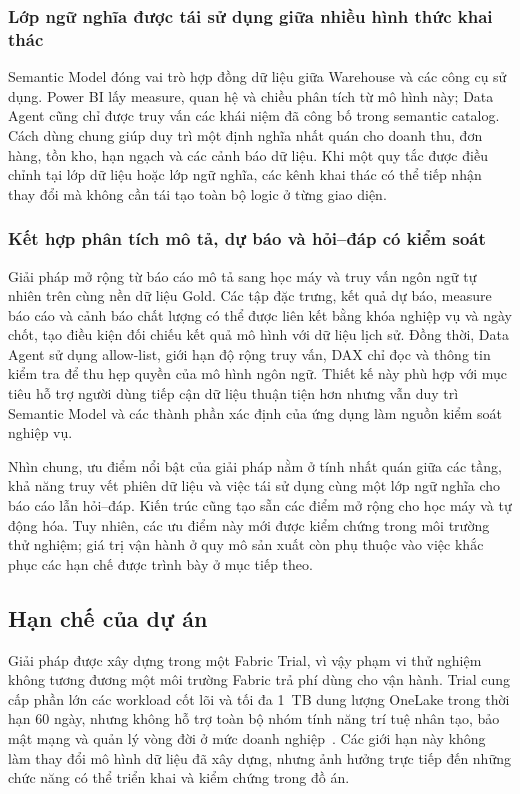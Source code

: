 \subsubsection{Lớp ngữ nghĩa được tái sử dụng giữa nhiều hình thức khai thác}

Semantic Model đóng vai trò hợp đồng dữ liệu giữa Warehouse và các công cụ sử dụng. Power BI lấy measure, quan hệ và chiều phân tích từ mô hình này; Data Agent cũng chỉ được truy vấn các khái niệm đã công bố trong semantic catalog. Cách dùng chung giúp duy trì một định nghĩa nhất quán cho doanh thu, đơn hàng, tồn kho, hạn ngạch và các cảnh báo dữ liệu. Khi một quy tắc được điều chỉnh tại lớp dữ liệu hoặc lớp ngữ nghĩa, các kênh khai thác có thể tiếp nhận thay đổi mà không cần tái tạo toàn bộ logic ở từng giao diện.

\subsubsection{Kết hợp phân tích mô tả, dự báo và hỏi--đáp có kiểm soát}

Giải pháp mở rộng từ báo cáo mô tả sang học máy và truy vấn ngôn ngữ tự nhiên trên cùng nền dữ liệu Gold. Các tập đặc trưng, kết quả dự báo, measure báo cáo và cảnh báo chất lượng có thể được liên kết bằng khóa nghiệp vụ và ngày chốt, tạo điều kiện đối chiếu kết quả mô hình với dữ liệu lịch sử. Đồng thời, Data Agent sử dụng allow-list, giới hạn độ rộng truy vấn, DAX chỉ đọc và thông tin kiểm tra để thu hẹp quyền của mô hình ngôn ngữ. Thiết kế này phù hợp với mục tiêu hỗ trợ người dùng tiếp cận dữ liệu thuận tiện hơn nhưng vẫn duy trì Semantic Model và các thành phần xác định của ứng dụng làm nguồn kiểm soát nghiệp vụ.

Nhìn chung, ưu điểm nổi bật của giải pháp nằm ở tính nhất quán giữa các tầng, khả năng truy vết phiên dữ liệu và việc tái sử dụng cùng một lớp ngữ nghĩa cho báo cáo lẫn hỏi--đáp. Kiến trúc cũng tạo sẵn các điểm mở rộng cho học máy và tự động hóa. Tuy nhiên, các ưu điểm này mới được kiểm chứng trong môi trường thử nghiệm; giá trị vận hành ở quy mô sản xuất còn phụ thuộc vào việc khắc phục các hạn chế được trình bày ở mục tiếp theo.

\subsection{Hạn chế của dự án}

Giải pháp được xây dựng trong một Fabric Trial, vì vậy phạm vi thử nghiệm không tương đương một môi trường Fabric trả phí dùng cho vận hành. Trial cung cấp phần lớn các workload cốt lõi và tối đa 1~TB dung lượng OneLake trong thời hạn 60 ngày, nhưng không hỗ trợ toàn bộ nhóm tính năng trí tuệ nhân tạo, bảo mật mạng và quản lý vòng đời ở mức doanh nghiệp~\citep{microsoft-fabric-trial}. Các giới hạn này không làm thay đổi mô hình dữ liệu đã xây dựng, nhưng ảnh hưởng trực tiếp đến những chức năng có thể triển khai và kiểm chứng trong đồ án.

